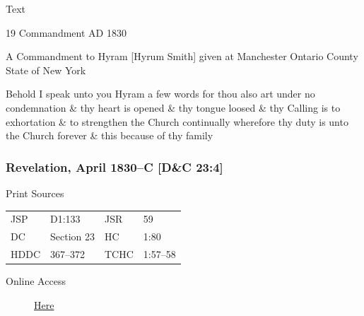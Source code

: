 			
			\begin{description}
				\item[Text]
			\end{description}
			
				\begin{tightcenter}
				19 Commandment AD 1830
				\end{tightcenter}
				
				A Commandment to Hyram [Hyrum Smith] given at Manchester Ontario County State of New York
				
				Behold I speak unto you Hyram a few words for thou also art under no condemnation \& thy heart is opened \& thy tongue loosed \& thy Calling is to exhortation \& to strengthen the Church continually wherefore thy duty is unto the Church forever \& this because of thy family
				
		\subsubsection{Revelation, April 1830--C [D\&C 23:4]}
			\label{EMS-1830-JS-APR-1830-C}
		
			\begin{description}
				\item[Print Sources]
			\end{description}

				\begin{tabular}{p{0.5in}p{1in}p{0.5in}p{1in}}
				JSP	 	& D1:133		& JSR 		& 59	 \\
				DC	 	& Section 23	& HC 		& 1:80	 \\
				HDDC 	& 367--372		& TCHC 		& 1:57--58 \\
				\end{tabular}
			
			\begin{description}
				\item[Online Access] \href{https://www.josephsmithpapers.org/paper-summary/revelation-april-1830-c-dc-234/1}{Here}
			\end{description}
			

